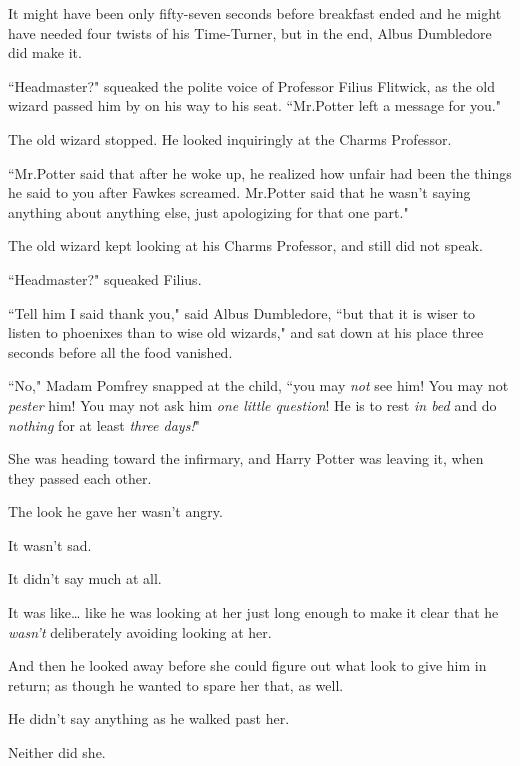 
It might have been only fifty-seven seconds before breakfast ended and he might have needed four twists of his Time-Turner, but in the end, Albus Dumbledore did make it.

``Headmaster?" squeaked the polite voice of Professor Filius Flitwick, as the old wizard passed him by on his way to his seat. ``Mr.\?Potter left a message for you."

The old wizard stopped. He looked inquiringly at the Charms Professor.

``Mr.\?Potter said that after he woke up, he realized how unfair had been the things he said to you after Fawkes screamed. Mr.\?Potter said that he wasn't saying anything about anything else, just apologizing for that one part."

The old wizard kept looking at his Charms Professor, and still did not speak.

``Headmaster?" squeaked Filius.

``Tell him I said thank you," said Albus Dumbledore, ``but that it is wiser to listen to phoenixes than to wise old wizards," and sat down at his place three seconds before all the food vanished.


``No," Madam Pomfrey snapped at the child, ``you may \emph{not} see him! You may not \emph{pester} him! You may not ask him \emph{one little question}! He is to rest \emph{in bed} and do \emph{nothing} for at least \emph{three days!}"


She was heading toward the infirmary, and Harry Potter was leaving it, when they passed each other.

The look he gave her wasn't angry.

It wasn't sad.

It didn't say much at all.

It was like{\ldots} like he was looking at her just long enough to make it clear that he \emph{wasn't} deliberately avoiding looking at her.

And then he looked away before she could figure out what look to give him in return; as though he wanted to spare her that, as well.

He didn't say anything as he walked past her.

Neither did she.


